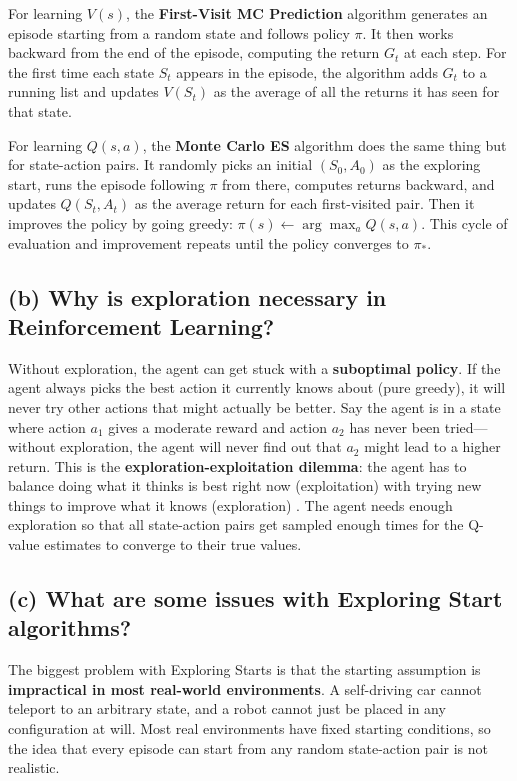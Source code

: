 \documentclass[letterpaper]{article}
\begin{document}
For learning $V(s)$, the \textbf{First-Visit MC Prediction} algorithm generates an episode starting from a random state and follows policy $\pi$. It then works backward from the end of the episode, computing the return $G_t$ at each step. For the first time each state $S_t$ appears in the episode, the algorithm adds $G_t$ to a running list and updates $V(S_t)$ as the average of all the returns it has seen for that state.

For learning $Q(s, a)$, the \textbf{Monte Carlo ES} algorithm does the same thing but for state-action pairs. It randomly picks an initial $(S_0, A_0)$ as the exploring start, runs the episode following $\pi$ from there, computes returns backward, and updates $Q(S_t, A_t)$ as the average return for each first-visited pair. Then it improves the policy by going greedy: $\pi(s) \leftarrow \arg\max_a Q(s, a)$. This cycle of evaluation and improvement repeats until the policy converges to $\pi_*$.

\subsection*{(b) Why is exploration necessary in Reinforcement Learning?}

Without exploration, the agent can get stuck with a \textbf{suboptimal policy}. If the agent always picks the best action it currently knows about (pure greedy), it will never try other actions that might actually be better. Say the agent is in a state where action $a_1$ gives a moderate reward and action $a_2$ has never been tried---without exploration, the agent will never find out that $a_2$ might lead to a higher return. This is the \textbf{exploration-exploitation dilemma}: the agent has to balance doing what it thinks is best right now (exploitation) with trying new things to improve what it knows (exploration) \citep{sutton2018reinforcement}. The agent needs enough exploration so that all state-action pairs get sampled enough times for the Q-value estimates to converge to their true values.

\subsection*{(c) What are some issues with Exploring Start algorithms?}

The biggest problem with Exploring Starts is that the starting assumption is \textbf{impractical in most real-world environments}. A self-driving car cannot teleport to an arbitrary state, and a robot cannot just be placed in any configuration at will. Most real environments have fixed starting conditions, so the idea that every episode can start from any random state-action pair is not realistic.
\end{document}
